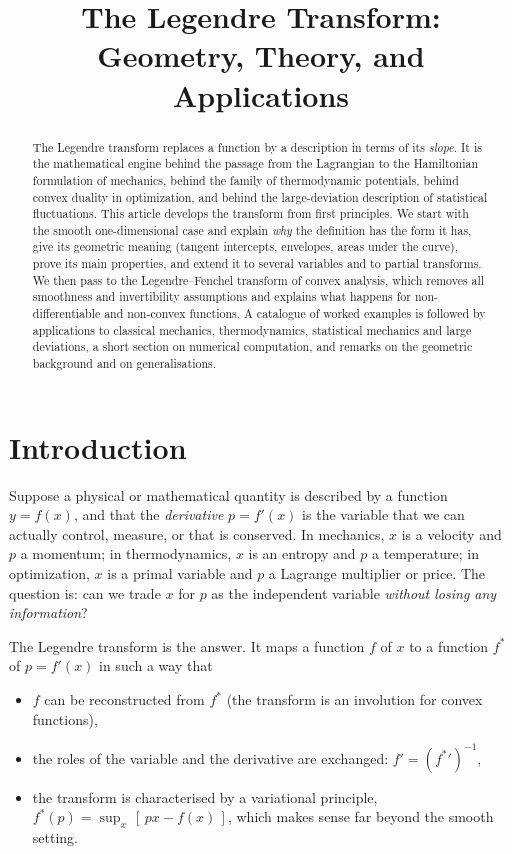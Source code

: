 \documentclass[11pt,a4paper]{article}
\title{The Legendre Transform:\\ Geometry, Theory, and Applications}
\author{}
\date{}
\theoremstyle{plain}
\theoremstyle{definition}
\theoremstyle{remark}
\begin{document}
\maketitle

\begin{abstract}
The Legendre transform replaces a function by a description in terms of its
\emph{slope}. It is the mathematical engine behind the passage from the
Lagrangian to the Hamiltonian formulation of mechanics, behind the family of
thermodynamic potentials, behind convex duality in optimization, and behind
the large-deviation description of statistical fluctuations.  This article
develops the transform from first principles.  We start with the smooth
one-dimensional case and explain \emph{why} the definition has the form it
has, give its geometric meaning (tangent intercepts, envelopes, areas under
the curve), prove its main properties, and extend it to several variables and
to partial transforms.  We then pass to the Legendre--Fenchel transform of
convex analysis, which removes all smoothness and invertibility assumptions
and explains what happens for non-differentiable and non-convex functions.
A catalogue of worked examples is followed by applications to classical
mechanics, thermodynamics, statistical mechanics and large deviations, a
short section on numerical computation, and remarks on the geometric
background and on generalisations.
\end{abstract}

\tableofcontents
\bigskip

\section{Introduction}

Suppose a physical or mathematical quantity is described by a function
$y=f(x)$, and that the \emph{derivative} $p=f'(x)$ is the variable that we can
actually control, measure, or that is conserved.  In mechanics, $x$ is a
velocity and $p$ a momentum; in thermodynamics, $x$ is an entropy and $p$ a
temperature; in optimization, $x$ is a primal variable and $p$ a Lagrange
multiplier or price.  The question is: can we trade $x$ for $p$ as the
independent variable \emph{without losing any information}?

The Legendre transform is the answer.  It maps a function $f$ of $x$ to a
function $f^*$ of $p=f'(x)$ in such a way that
\begin{itemize}[nosep]
  \item $f$ can be reconstructed from $f^*$ (the transform is an involution
        for convex functions),
  \item the roles of the variable and the derivative are exchanged:
        $f'=(f^*{}')^{-1}$,
  \item the transform is characterised by a variational principle,
        $f^*(p)=\sup_x\,[\,px-f(x)\,]$, which makes sense far beyond the
        smooth setting.
\end{itemize}
\end{document}
